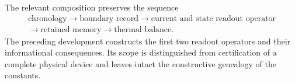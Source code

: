 The relevant composition preserves the sequence
\[
 \begin{gathered}
 \text{chronology}\longrightarrow
 \text{boundary record}\longrightarrow
 \text{current and state readout operator}\\
 \longrightarrow
 \text{retained memory}\longrightarrow
 \text{thermal balance}.
 \end{gathered}
\]
The preceding development constructs the first two readout operators and their
informational consequences. Its scope is distinguished from certification
of a complete physical device and leaves intact the constructive
genealogy of the constants.
